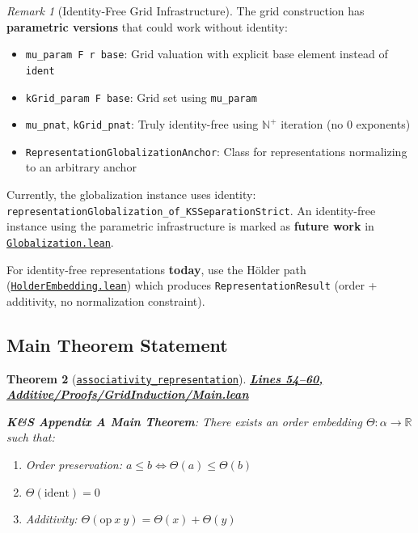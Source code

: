\documentclass[11pt]{article}
\newtheorem{theorem}{Theorem}[section]
\theoremstyle{definition}
\theoremstyle{remark}
\newtheorem{remark}[theorem]{Remark}
\begin{document}
\begin{remark}[Identity-Free Grid Infrastructure]
The grid construction has \textbf{parametric versions} that could work without identity:
\begin{itemize}
\item \texttt{mu\_param F r base}: Grid valuation with explicit base element instead of \texttt{ident}
\item \texttt{kGrid\_param F base}: Grid set using \texttt{mu\_param}
\item \texttt{mu\_pnat}, \texttt{kGrid\_pnat}: Truly identity-free using $\mathbb{N}^+$ iteration (no 0 exponents)
\item \texttt{RepresentationGlobalizationAnchor}: Class for representations normalizing to an arbitrary anchor
\end{itemize}

Currently, the globalization instance uses identity:
\\
\texttt{representationGlobalization\_of\_KSSeparationStrict}.
An identity-free instance using the parametric infrastructure is marked as \textbf{future work} in \href{https://github.com/zariuq/ks-foundations-of-inference/blob/main/KnuthSkilling/Additive/Proofs/GridInduction/Globalization.lean}{\texttt{Globalization.lean}}.

For identity-free representations \textbf{today}, use the Hölder path (\href{https://github.com/zariuq/ks-foundations-of-inference/blob/main/KnuthSkilling/Additive/Proofs/OrderedSemigroupEmbedding/HolderEmbedding.lean}{\texttt{HolderEmbedding.lean}})
which produces \texttt{RepresentationResult} (order + additivity, no normalization constraint).
\end{remark}

\subsection{Main Theorem Statement}

\begin{theorem}[\href{https://github.com/zariuq/ks-foundations-of-inference/blob/main/KnuthSkilling/Additive/Proofs/GridInduction/Main.lean\#L54}{\texttt{associativity\_representation}}]
\textbf{\href{https://github.com/zariuq/ks-foundations-of-inference/blob/main/KnuthSkilling/Additive/Proofs/GridInduction/Main.lean\#L54-L60}{Lines 54--60, Additive/Proofs/GridInduction/Main.lean}}

\textbf{K\&S Appendix A Main Theorem}: There exists an order embedding $\Theta : \alpha \to \mathbb{R}$ such that:
\begin{enumerate}
\item Order preservation: $a \leq b \Leftrightarrow \Theta(a) \leq \Theta(b)$
\item $\Theta(\text{ident}) = 0$
\item Additivity: $\Theta(\text{op}\ x\ y) = \Theta(x) + \Theta(y)$
\end{enumerate}
\end{theorem}
\end{document}
